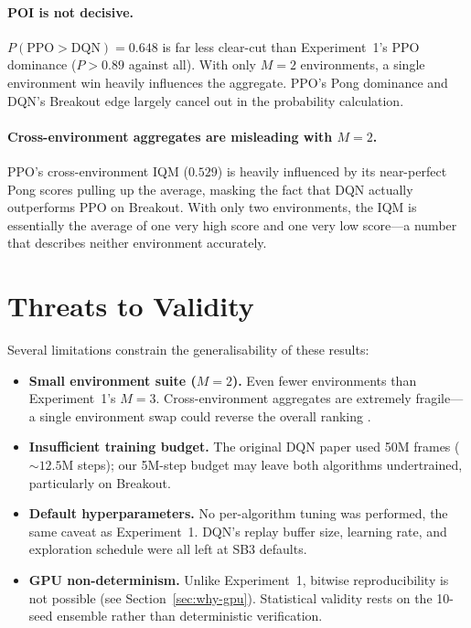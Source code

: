 \paragraph{POI is not decisive.}
$P(\text{PPO} > \text{DQN}) = 0.648$ is far less clear-cut than
Experiment~1's PPO dominance ($P > 0.89$ against all). With only
$M = 2$ environments, a single environment win heavily influences
the aggregate. PPO's Pong dominance and DQN's Breakout edge largely
cancel out in the probability calculation.

\paragraph{Cross-environment aggregates are misleading with $M = 2$.}
PPO's cross-environment IQM ($0.529$) is heavily influenced by its
near-perfect Pong scores pulling up the average, masking the fact
that DQN actually outperforms PPO on Breakout. With only two
environments, the IQM is essentially the average of one very high
score and one very low score---a number that describes neither
environment accurately.

{\color{red} \section{Threats to Validity}}
\label{sec:atari-threats}

Several limitations constrain the generalisability of these results:
\begin{itemize}
  \item \textbf{Small environment suite ($M = 2$).} Even fewer
        environments than Experiment~1's $M = 3$. Cross-environment
        aggregates are extremely fragile---a single environment swap
        could reverse the overall ranking
        \citep{agarwal2021precipice, patterson2024edrl}.
  \item \textbf{Insufficient training budget.} The original DQN paper
        \citep{mnih2015human} used 50M frames (${\sim}12.5$M steps);
        our 5M-step budget may leave both algorithms undertrained,
        particularly on Breakout.
  \item \textbf{Default hyperparameters.} No per-algorithm tuning was
        performed, the same caveat as Experiment~1. DQN's replay buffer
        size, learning rate, and exploration schedule were all left at
        SB3 defaults.
  \item \textbf{GPU non-determinism.} Unlike Experiment~1, bitwise reproducibility is not possible (see Section~\ref{sec:why-gpu}). Statistical validity rests on the 10-seed ensemble rather than deterministic verification.
\end{itemize}

